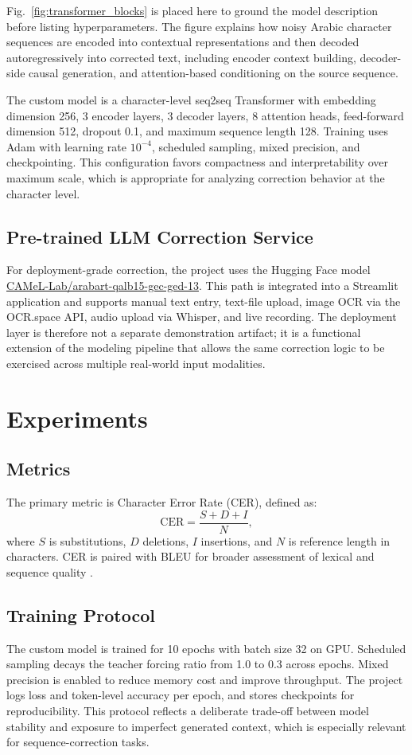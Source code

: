 \documentclass[conference]{IEEEtran}
\begin{document}
Fig.~\ref{fig:transformer_blocks} is placed here to ground the model description before listing hyperparameters. The figure explains how noisy Arabic character sequences are encoded into contextual representations and then decoded autoregressively into corrected text, including encoder context building, decoder-side causal generation, and attention-based conditioning on the source sequence.

The custom model is a character-level seq2seq Transformer with embedding dimension 256, 3 encoder layers, 3 decoder layers, 8 attention heads, feed-forward dimension 512, dropout 0.1, and maximum sequence length 128. Training uses Adam \cite{kingma2015adam} with learning rate $10^{-4}$, scheduled sampling, mixed precision, and checkpointing. This configuration favors compactness and interpretability over maximum scale, which is appropriate for analyzing correction behavior at the character level.

\subsection{Pre-trained LLM Correction Service}
For deployment-grade correction, the project uses the Hugging Face model \url{CAMeL-Lab/arabart-qalb15-gec-ged-13}. This path is integrated into a Streamlit application and supports manual text entry, text-file upload, image OCR via the OCR.space API, audio upload via Whisper, and live recording. The deployment layer is therefore not a separate demonstration artifact; it is a functional extension of the modeling pipeline that allows the same correction logic to be exercised across multiple real-world input modalities.

\section{Experiments}
\subsection{Metrics}
The primary metric is Character Error Rate (CER), defined as:
\begin{equation}
\mathrm{CER}=\frac{S+D+I}{N},
\end{equation}
where $S$ is substitutions, $D$ deletions, $I$ insertions, and $N$ is reference length in characters. CER is paired with BLEU for broader assessment of lexical and sequence quality \cite{levenshtein1966,papineni2002bleu}.

\subsection{Training Protocol}
The custom model is trained for 10 epochs with batch size 32 on GPU. Scheduled sampling decays the teacher forcing ratio from 1.0 to 0.3 across epochs. Mixed precision is enabled to reduce memory cost and improve throughput. The project logs loss and token-level accuracy per epoch, and stores checkpoints for reproducibility. This protocol reflects a deliberate trade-off between model stability and exposure to imperfect generated context, which is especially relevant for sequence-correction tasks.
\end{document}
